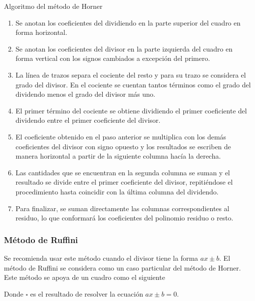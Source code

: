 Algoritmo del método de Horner
\begin{enumerate}
    \item Se anotan los coeficientes del dividiendo en la parte superior del cuadro en forma horizontal.
    \item Se anotan los coeficientes del divisor en la parte izquierda del cuadro en forma vertical con los signos cambiados a excepción del primero.
    \item La línea de trazos separa el cociente del resto y para su trazo se considera el grado del divisor.
    En el cociente se cuentan tantos términos como el grado del dividendo menos el grado del divisor más uno.
    \item El primer término del cociente se obtiene dividiendo el primer coeficiente del dividendo entre el primer coeficiente del divisor.
    \item El coeficiente obtenido en el paso anterior se multiplica con los demás coeficientes del divisor con signo opuesto y los resultados se escriben de manera horizontal a partir de la siguiente columna hacía la derecha.
    \item Las cantidades que se encuentran en la segunda columna se suman y el resultado se divide entre el primer coeficiente del divisor, repitiéndose el procedimiento hasta coincidir con la última columna del dividendo.
    \item Para finalizar, se suman directamente las columnas correspondientes al residuo, lo que conformará los coeficientes del polinomio residuo o resto.
\end{enumerate}



\subsubsection{Método de Ruffini}

Se recomienda usar este método cuando el divisor tiene la forma $ax \pm b$.
El método de Ruffini se considera como un caso particular del método de Horner.
Este método se apoya de un cuadro como el siguiente
\begin{figure}[htb]
    \centering
\end{figure}
Donde $\square$ es el resultado de resolver la ecuación $ax \pm b = 0$.

